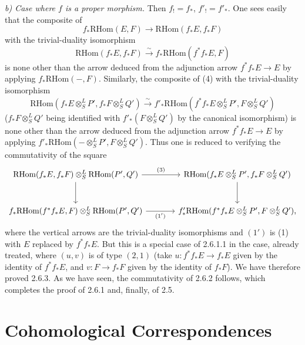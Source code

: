 \documentclass[11pt]{article}
\providecommand{\RHom}{\mathrm{RHom}}
\providecommand{\RHom}{\mathrm{RHom}}
\providecommand{\RHom}{\mathrm R\mathcal{H}om}
\begin{document}
\emph{b) Case where $f$ is a proper morphism.} Then $f_!=f_*$, $f'_!=f'_*$. One sees easily that the composite of
\[
f_*\RHom(E,F)\longrightarrow\RHom(f_*E,f_*F)
\]
with the trivial-duality isomorphism
\[
\RHom(f_*E,f_*F)\xrightarrow{\sim}f_*\RHom(f^{*}f_*E,F)
\]
is none other than the arrow deduced from the adjunction arrow $f^{*}f_*E\to E$ by applying $f_*\RHom(-,F)$. Similarly, the composite of (4) with the trivial-duality isomorphism
\[
\RHom(f_*E\otimes^L_SP',f_*F\otimes^L_SQ')\xrightarrow{\sim}f'_*\RHom(f^{*}f_*E\otimes^L_SP',F\otimes^L_SQ')
\]
($f_*F\otimes^L_SQ'$ being identified with $f'_*(F\otimes^L_SQ')$ by the canonical isomorphism) is none other than the arrow deduced from the adjunction arrow $f^{*}f_*E\to E$ by applying $f'_*\RHom(-\otimes^L_SP',F\otimes^L_SQ')$. Thus one is reduced to verifying the commutativity of the square
\[
\begin{tikzcd}[column sep=large,row sep=large]
\RHom(f_*E,f_*F)\otimes^L_S\RHom(P',Q') \arrow[r,"(3)"] \arrow[d] & \RHom(f_*E\otimes^L_SP',f_*F\otimes^L_SQ') \arrow[d]\\
f_*\RHom(f^{*}f_*E,F)\otimes^L_S\RHom(P',Q') \arrow[r,"(1')"'] & f'_*\RHom(f^{*}f_*E\otimes^L_SP',F\otimes^L_SQ'),
\end{tikzcd}
\]
where the vertical arrows are the trivial-duality isomorphisms and $(1')$ is (1) with $E$ replaced by $f^{*}f_*E$. But this is a special case of 2.6.1.1 in the case, already treated, where $(u,v)$ is of type $(2,1)$ (take $u:f^{*}f_*E\to f_*E$ given by the identity of $f^{*}f_*E$, and $v:F\to f_*F$ given by the identity of $f_*F$). We have therefore proved 2.6.3. As we have seen, the commutativity of 2.6.2 follows, which completes the proof of 2.6.1 and, finally, of 2.5.

\clearpage
\section{Cohomological Correspondences}
\end{document}
